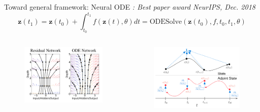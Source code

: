 \documentclass[handout]{beamer}
\newcommand{\rref}[1][]{\hfill{\scriptsize\textit{#1}}}
\begin{document}
\begin{frame}{Toward general framework: Neural ODE}
    \rref[\cite{Chen2018NeuralEquations}: Best paper award NeurIPS, Dec. 2018]
    $$
    \mathbf{z}(t_1) = \mathbf{z}(t_0)  + \int_{t_0}^{t_1} f(\mathbf{z}(t),\theta) dt = \textrm{ODESolve}(\mathbf{z}(t_0),f,t_0,t_1,\theta)
    $$
    \begin{columns}
    \begin{figure}
        \centering
        \includegraphics[width=\textwidth]{fig/L3/resVsODE.png}
    \end{figure}
        \begin{figure}
        \centering
        \includegraphics[width=\textwidth,trim={0 5.4cm 0 0},clip]{fig/L3/ODEscheme.png}
    \end{figure}
    \end{columns}
\end{frame}
\end{document}
